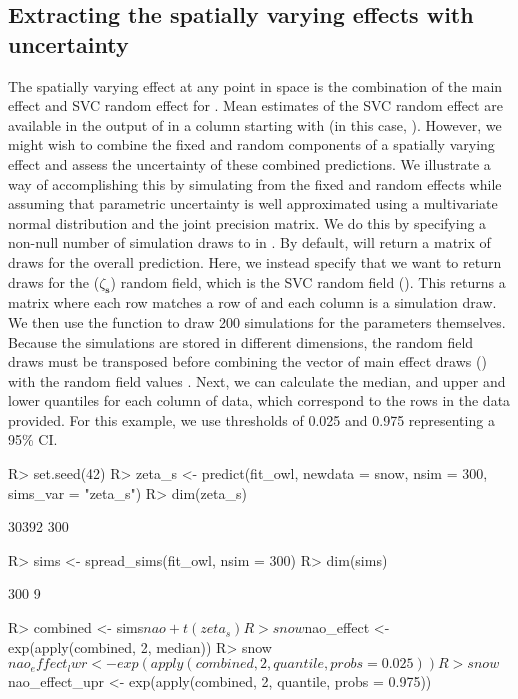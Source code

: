 \documentclass[article]{jss}\usepackage[]{graphicx}\usepackage[dvipsnames]{xcolor}
\newcommand{\fct}[1]{\code{#1()}}
\begin{document}
\subsection{Extracting the spatially varying effects with uncertainty}

The spatially varying effect at any point in space is the combination of the main effect and SVC random effect for .
Mean estimates of the SVC random effect are available in the output of \fct{predict.sdmTMB} in a column starting with  (in this case, ).
However, we might wish to combine the fixed and random components of a spatially varying effect and assess the uncertainty of these combined predictions.
We illustrate a way of accomplishing this by simulating from the fixed and random effects while assuming that parametric uncertainty is well approximated using a multivariate normal distribution and the joint precision matrix.
We do this by specifying a non-null number of simulation draws to  in \fct{predict.sdmTMB}.
By default,  will return a matrix of draws for the overall prediction.
Here, we instead specify that we want to return draws for the  ($\zeta_{\bm{s}}$) random field, which is the SVC random field ().
This returns a matrix where each row matches a row of  and each column is a simulation draw.
We then use the function \fct{spread\_sims} to draw 200 simulations for the parameters themselves.
Because the simulations are stored in different dimensions, the random field draws must be transposed  before combining the vector of main effect draws () with the random field values .
Next, we can calculate the median, and upper and lower quantiles for each column of data, which correspond to the rows in the data provided.
For this example, we use thresholds of 0.025 and 0.975 representing a 95\% CI.



\begin{Schunk}
\begin{Sinput}
R> set.seed(42)
R> zeta_s <- predict(fit_owl, newdata = snow, nsim = 300, sims_var = "zeta_s")
R> dim(zeta_s)
\end{Sinput}
\begin{Soutput}
[1] 30392   300
\end{Soutput}
\begin{Sinput}
R> sims <- spread_sims(fit_owl, nsim = 300)
R> dim(sims)
\end{Sinput}
\begin{Soutput}
[1] 300   9
\end{Soutput}
\begin{Sinput}
R> combined <- sims$nao + t(zeta_s)
R> snow$nao_effect <- exp(apply(combined, 2, median))
R> snow$nao_effect_lwr <- exp(apply(combined, 2, quantile, probs = 0.025))
R> snow$nao_effect_upr <- exp(apply(combined, 2, quantile, probs = 0.975))
\end{Sinput}
\end{Schunk}
\end{document}
